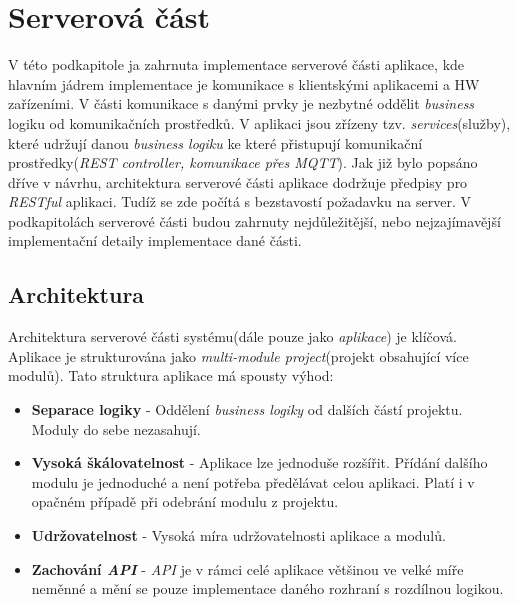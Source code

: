\section{Serverová část}
\label{impl:backend}
V této podkapitole ja zahrnuta implementace serverové části aplikace, kde hlavním jádrem implementace je komunikace s klientskými aplikacemi a HW zařízeními.
V části komunikace s danými prvky je nezbytné oddělit \emph{business} logiku od komunikačních prostředků.
V aplikaci jsou zřízeny tzv. \emph{services}(služby), které udržují danou \emph{business logiku} ke které přistupují komunikační prostředky(\emph{REST controller, komunikace přes MQTT}).
Jak již bylo popsáno dříve v návrhu, architektura serverové části aplikace dodržuje předpisy pro \emph{RESTful} aplikaci.
Tudíž se zde počítá s bezstavostí požadavku na server.
V podkapitolách serverové části budou zahrnuty nejdůležitější, nebo nejzajímavější implementační detaily implementace dané části.

\subsection*{Architektura}
\label{impl:backend:architektura}
Architektura serverové části systému(dále pouze jako \emph{aplikace}) je klíčová.
Aplikace je strukturována jako \emph{multi-module project}(projekt obsahující více modulů).
\newline
Tato struktura aplikace má spousty výhod:
\begin{itemize}
  \item \textbf{Separace logiky} - Oddělení \emph{business logiky} od dalších částí projektu. Moduly do sebe nezasahují.
  \item \textbf{Vysoká škálovatelnost} - Aplikace lze jednoduše rozšířit. Přídání dalšího modulu je jednoduché a není potřeba předělávat celou aplikaci. Platí i v opačném případě při odebrání modulu z projektu.
  \item \textbf{Udržovatelnost} - Vysoká míra udržovatelnosti aplikace a modulů.
  \item \textbf{Zachování \emph{API}} - \emph{API} je v rámci celé aplikace většinou ve velké míře neměnné a mění se pouze implementace daného rozhraní s rozdílnou logikou.
\end{itemize}

